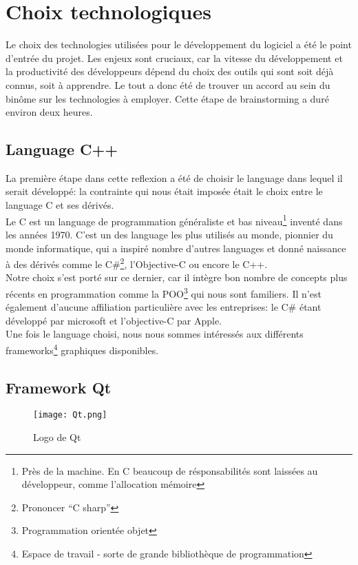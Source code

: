\chapter{Choix technologiques}
    Le choix des technologies utilisées pour le développement du logiciel a été le point d'entrée du projet. Les enjeux sont cruciaux, car la vitesse du développement et la productivité des développeurs dépend du choix des outils qui sont soit déjà connus, soit à apprendre. Le tout a donc été de trouver un accord au sein du binôme sur les technologies à employer. Cette étape de brainstorming a duré environ deux heures.

    \section{Language C++}
        La première étape dans cette reflexion a été de choisir le language dans lequel il serait développé: la contrainte qui nous était imposée 
        était le choix entre le language C et ses dérivés.
        \\ Le C est un language de programmation généraliste et bas niveau\footnote{Près de la machine. En C beaucoup de résponsabilités sont laissées au développeur, comme l'allocation mémoire} inventé dans les années 1970. C'est un des language les plus utilisés au monde, pionnier du monde informatique, qui a inspiré nombre d'autres languages et donné naissance à des dérivés comme le C\#\footnote{Prononcer ``C sharp''}, 
        l'Objective-C ou encore le C++.
        \\ Notre choix s'est porté sur ce dernier, car il intègre bon nombre de concepts plus récents en programmation comme la POO\footnote{Programmation
        orientée objet} qui nous sont familiers. Il n'est également d'aucune affiliation particulière avec les entreprises: le C\# étant développé par microsoft
        et l'objective-C par Apple.
        \\ Une fois le language choisi, nous nous sommes intéressés aux différents frameworks\footnote{Espace de travail - sorte de grande bibliothèque 
        de programmation}
        graphiques disponibles.

    \section{Framework Qt}
        \begin{figure}[h]
            \begin{center}
                \texttt{[image: Qt.png]}
            \end{center}

            \caption{Logo de Qt}
            \label{Qt}
        \end{figure}

